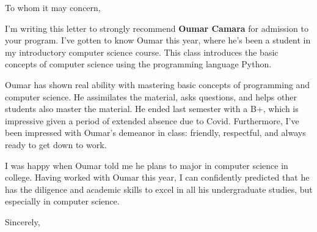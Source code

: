 \documentclass{letter}
\begin{document}
\begin{letter}{}
\opening{To whom it may concern,}

I'm writing this letter to strongly recommend  \textbf{Oumar Camara} for admission to your program.  I've gotten to know Oumar this year, where he's been a student in my    introductory computer science course.  This class introduces  the basic concepts of computer science using the programming language Python.   

Oumar has shown real ability with mastering basic concepts of programming and computer science.  He assimilates the material, asks questions, and helps other students also master the material.  He ended last semester with a B+, which is impressive given a period of extended absence due to Covid.   Furthermore, I've been impressed with Oumar's demeanor in class: friendly, respectful, and always ready to get down to work.  

I was happy when Oumar told me he plans to major in computer science in college.  Having worked with Oumar this year, I can confidently predicted that he has the diligence and academic skills  to  excel in all his undergraduate studies, but especially in computer science.

\closing{Sincerely,}

\end{letter}
\end{document}
